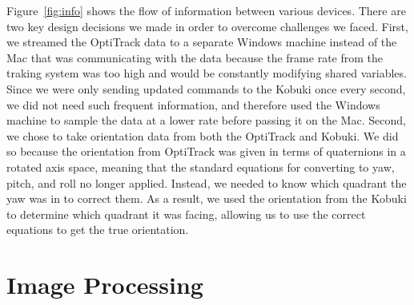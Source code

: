 \documentclass[10pt]{article}
\begin{document}
\begin{multicols}{2}
  Figure~\ref{fig:info} shows the flow of information between various devices.
  There are two key design decisions we made in order to overcome challenges we
  faced. First, we streamed the OptiTrack data to a separate Windows machine
  instead of the Mac that was communicating with the data because the frame rate
  from the traking system was too high and would be constantly modifying shared
  variables. Since we were only sending updated commands to the Kobuki once
  every second, we did not need such frequent information, and therefore used
  the Windows machine to sample the data at a lower rate before passing it on
  the Mac. Second, we chose to take orientation data from both the OptiTrack and
  Kobuki. We did so because the orientation from OptiTrack was given in terms of
  quaternions in a rotated axis space, meaning that the standard equations for
  converting to yaw, pitch, and roll no longer applied. Instead, we needed to
  know which quadrant the yaw was in to correct them. As a result, we used the
  orientation from the Kobuki to determine which quadrant it was facing,
  allowing us to use the correct equations to get the true orientation.

  \section*{Image Processing}


\end{multicols}
\end{document}
